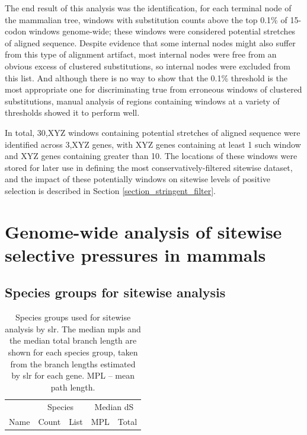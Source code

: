 
The end result of this analysis was the identification, for each
terminal node of the mammalian tree, windows with \nsyn substitution
counts above the top 0.1\% of 15-codon windows genome-wide; these
windows were considered potential stretches of \nhom aligned
sequence. Despite evidence that some internal nodes might also suffer
from this type of alignment artifact, most internal nodes were free
from an obvious excess of clustered \nsyn substitutions, so internal
nodes were excluded from this list. And although there is no way to
show that the 0.1\% threshold is the most appropriate one for
discriminating true from erroneous windows of clustered substitutions,
manual analysis of regions containing windows at a variety of
thresholds showed it to perform well.

In total, 30,XYZ 
windows containing potential stretches of \nhom aligned sequence were
identified across 3,XYZ genes, with XYZ genes containing at least 1
such window and XYZ genes containing greater than 10. The locations of
these windows were stored for later use in defining the most
conservatively-filtered sitewise dataset, and the impact of these
potentially \nhom windows on sitewise levels of positive selection is
described in Section \ref{section_stringent_filter}.

\section{Genome-wide analysis of sitewise selective pressures in mammals}

\subsection{Species groups for sitewise analysis}

\begin{table}
\centering \footnotesize
\begin{tabular}{lrb{8cm}rr}
\toprule
 & \multicolumn{2}{c}{Species} & \multicolumn{2}{c}{Median dS} \\
\cmidrule(r){2-3} \cmidrule{4-5}
Name & Count & List & MPL & Total \\
  \midrule

\bottomrule
\end{tabular}
\caption{Species groups used for sitewise analysis by \ac{slr}. The
  median \acp{mpl} and the median total branch length are shown for
  each species group, taken from the \ngenes branch lengths estimated
  by \ac{slr} for each gene. MPL -- mean path length.}
\label{table_species_set_summary}
\end{table}

